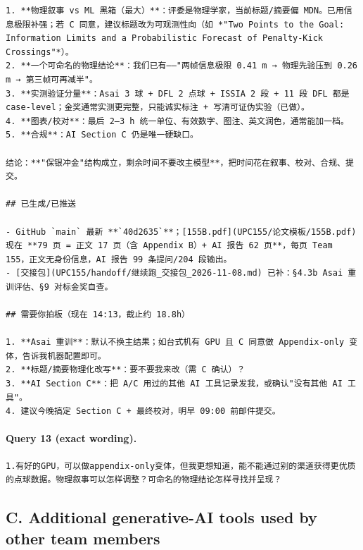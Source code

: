 \documentclass[UTF8,10pt]{ctexart}
\begin{document}
\begin{Verbatim}[breaklines=true,breakanywhere=true,fontsize=\scriptsize,frame=single,framesep=2pt]
1. **物理叙事 vs ML 黑箱（最大）**：评委是物理学家，当前标题/摘要偏 MDN。已用信息极限补强；若 C 同意，建议标题改为可观测性向（如 *"Two Points to the Goal: Information Limits and a Probabilistic Forecast of Penalty-Kick Crossings"*）。
2. **一个可命名的物理结论**：我们已有——"两帧信息极限 0.41 m → 物理先验压到 0.26 m → 第三帧可再减半"。
3. **实测验证分量**：Asai 3 球 + DFL 2 点球 + ISSIA 2 段 + 11 段 DFL 都是 case-level；金奖通常实测更完整，只能诚实标注 + 写清可证伪实验（已做）。
4. **图表/校对**：最后 2–3 h 统一单位、有效数字、图注、英文润色，通常能加一档。
5. **合规**：AI Section C 仍是唯一硬缺口。

结论：**"保银冲金"结构成立，剩余时间不要改主模型**，把时间花在叙事、校对、合规、提交。

## 已生成/已推送

- GitHub `main` 最新 **`40d2635`**；[155B.pdf](UPC155/论文模板/155B.pdf) 现在 **79 页 = 正文 17 页（含 Appendix B）+ AI 报告 62 页**，每页 Team 155，正文无身份信息，AI 报告 99 条提问/204 段输出。
- [交接包](UPC155/handoff/继续跑_交接包_2026-11-08.md) 已补：§4.3b Asai 重训评估、§9 对标金奖自查。

## 需要你拍板（现在 14:13，截止约 18.8h）

1. **Asai 重训**：默认不换主结果；如台式机有 GPU 且 C 同意做 Appendix-only 变体，告诉我机器配置即可。
2. **标题/摘要物理化改写**：要不要我来改（需 C 确认）？
3. **AI Section C**：把 A/C 用过的其他 AI 工具记录发我，或确认"没有其他 AI 工具"。
4. 建议今晚搞定 Section C + 最终校对，明早 09:00 前邮件提交。
\end{Verbatim}

\paragraph{Query 13 (exact wording).}
\begin{Verbatim}[breaklines=true,breakanywhere=true,fontsize=\scriptsize,frame=single,framesep=2pt]
1.有好的GPU，可以做appendix-only变体，但我更想知道，能不能通过别的渠道获得更优质的点球数据。物理叙事可以怎样调整？可命名的物理结论怎样寻找并呈现？
\end{Verbatim}

\subsection*{C. Additional generative-AI tools used by other team members}

\end{document}
